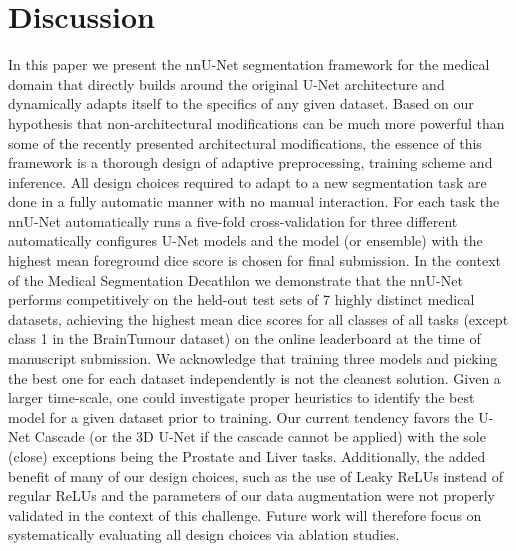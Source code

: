 \documentclass{templates/llncs} %
\begin{document}
\section{Discussion}
In this paper we present the nnU-Net segmentation framework for the medical domain that directly builds around the original U-Net architecture \cite{ronneberger2015u} and dynamically adapts itself to the specifics of any given dataset. 
Based on our hypothesis that non-architectural modifications can be much more powerful than some of the recently presented architectural modifications, the essence of this framework is a thorough design of adaptive preprocessing, training scheme and inference. All design choices required to adapt to a new segmentation task are done in a fully automatic manner with no manual interaction.
For each task the nnU-Net automatically runs a five-fold cross-validation for three different automatically configures U-Net models and the model (or ensemble) with the highest mean foreground dice score is chosen for final submission. 
In the context of the Medical Segmentation Decathlon we demonstrate that the nnU-Net performs competitively on the held-out test sets of 7 highly distinct medical datasets, achieving the highest mean dice scores for all classes of all tasks (except class 1 in the BrainTumour dataset) on the online leaderboard at the time of manuscript submission. We acknowledge that training three models and picking the best one for each dataset independently is not the cleanest solution. Given a larger time-scale, one could investigate proper heuristics to identify the best model for a given dataset prior to training. Our current tendency favors the U-Net Cascade (or the 3D U-Net if the cascade cannot be applied) with the sole (close) exceptions being the Prostate and Liver tasks. Additionally, the added benefit of many of our design choices, such as the use of Leaky ReLUs instead of regular ReLUs and the parameters of our data augmentation were not properly validated in the context of this challenge. Future work will therefore focus on systematically evaluating all design choices via ablation studies.



\end{document}
